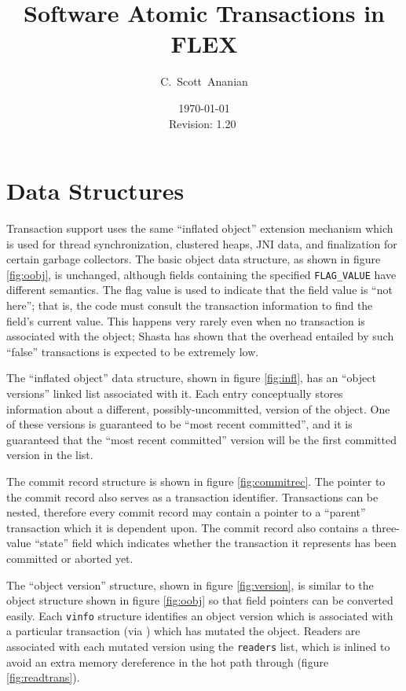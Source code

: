 \documentclass[11pt,notitlepage]{article}
\author{C.~Scott~Ananian}
\title{Software Atomic Transactions in FLEX}
\date{\today \\ $ $Revision: 1.20 $ $}
\begin{document}

\maketitle
\section{Data Structures}

Transaction support uses the same ``inflated object'' extension
mechanism which is used for thread synchronization, clustered heaps,
JNI data, and finalization for certain garbage collectors.
The basic object data structure, as shown in figure \ref{fig:oobj}, is
unchanged, although fields containing the specified
\texttt{FLAG\_VALUE} have different semantics.  The flag value is used
to indicate that the field value is ``not here''; that is, the code
must consult the transaction information to find the field's current
value.  This happens very rarely even when no transaction is
associated with the object; Shasta \cite{scales96:shasta} has shown that the
overhead entailed by such ``false'' transactions is expected to be
extremely low.

The ``inflated object'' data structure, shown in figure
\ref{fig:infl}, has an ``object versions'' linked list associated with
it.  Each entry conceptually stores information about a different,
possibly-uncommitted, version of the object.  One of these versions is
guaranteed to be ``most recent committed'', and it is guaranteed that
the ``most recent committed'' version will be the first committed
version in the list.

The commit record structure is shown in figure \ref{fig:commitrec}.
The pointer to the commit record also serves as a transaction
identifier.  Transactions can be nested, therefore every commit record
may contain a pointer to a ``parent'' transaction which it is
dependent upon.  The commit record also contains a three-value
``state'' field which indicates whether the transaction it represents
has been committed or aborted yet.

The ``object version'' structure, shown in figure
\ref{fig:version}, is similar to the object structure shown in
figure \ref{fig:oobj} so that field pointers can be converted easily.
Each \texttt{vinfo} structure identifies an object version which is
associated with a particular transaction (via ) which
has mutated the object.  Readers are associated with each mutated
version using the \texttt{readers} list, which is inlined to avoid an
extra memory dereference in the hot path through 
(figure \ref{fig:readtrans}).
\end{document}
